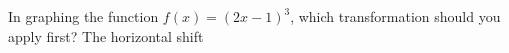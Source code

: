 {In graphing the function $f(x)=(2x-1)^3$, which transformation should you apply first?}
{The horizontal shift}
